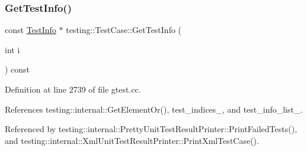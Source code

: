 \subsubsection{\texorpdfstring{Get\+Test\+Info()}{GetTestInfo()}}
{\footnotesize\ttfamily const \hyperlink{classtesting_1_1TestInfo}{Test\+Info} $\ast$ testing\+::\+Test\+Case\+::\+Get\+Test\+Info (\begin{DoxyParamCaption}\item[{int}]{i }\end{DoxyParamCaption}) const}



Definition at line 2739 of file gtest.\+cc.



References testing\+::internal\+::\+Get\+Element\+Or(), test\+\_\+indices\+\_\+, and test\+\_\+info\+\_\+list\+\_\+.



Referenced by testing\+::internal\+::\+Pretty\+Unit\+Test\+Result\+Printer\+::\+Print\+Failed\+Tests(), and testing\+::internal\+::\+Xml\+Unit\+Test\+Result\+Printer\+::\+Print\+Xml\+Test\+Case().


